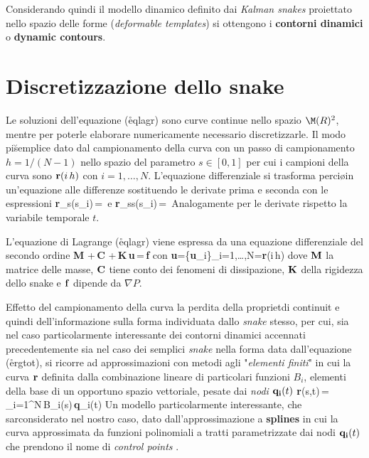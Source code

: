Considerando quindi il modello dinamico definito dai {\it Kalman snakes} proiettato
nello spazio delle forme ({\it deformable templates}) si ottengono i {\bf contorni dinamici}
o {\bf dynamic contours}.

\section{Discretizzazione dello snake}

Le soluzioni dell'equazione (\r{eqlagr}) sono curve continue nello spazio $\M(R)^2$, mentre
per poterle elaborare numericamente \e necessario discretizzarle.
Il modo pi\u semplice \e dato dal campionamento della curva con un passo di campionamento
$h=1/(N-1)$ nello spazio del parametro $s\in[0,1]$ per cui i campioni della curva sono 
${\bf r}(i\,h)$ con $i=1,\dots,N$.
L'equazione differenziale si trasforma perci\o in un'equazione alle differenze sostituendo
le derivate prima e seconda con le espressioni \footnotemark
\be
{\bf r}_s(s_i)\,=\, \quad e \quad
{\bf r}_{ss}(s_i)\,=\,
\ee
Analogamente per le derivate rispetto la variabile temporale $t$.


L'equazione di Lagrange (\r{eqlagr}) viene espressa da una equazione differenziale
del secondo ordine \cite{BlakeAV1}
\be
{\bf M\,}\,+\,{\bf C\,}\,+\,{\bf K\,u}\,=\,{\bf f} \quad con \quad
{\bf u}=\{{\bf u}_i\}_{i=1,\dots,N}={\bf r}(i\,h)
\ee
dove ${\bf M}$ \e la matrice delle masse, ${\bf C}$ tiene conto dei fenomeni di dissipazione,
${\bf K}$ della rigidezza dello snake e ${\bf f}$ dipende da $\nabla P$.

Effetto del campionamento della curva \e la perdita della propriet\a di continuit\a 
e quindi dell'informazione sulla forma individuata dallo {\it snake} stesso, per cui,
sia nel caso particolarmente interessante dei contorni dinamici accennati precedentemente
sia nel caso dei semplici {\it snake} nella forma data dall'equazione (\r{ergtot}), si ricorre
ad approssimazioni con metodi agli "{\it elementi finiti}" in cui la curva ${\bf r}$ \e
definita dalla combinazione lineare di particolari funzioni $B_i$, elementi della base di un
opportuno spazio vettoriale, pesate dai {\it nodi} ${\bf q_i}(t)$
\be
{\bf r}(s,t)\,=\,\sum_{i=1}^N\,B_i(s)\,{\bf q}_i(t)
\ee
Un modello particolarmente interessante, che sar\a considerato nel nostro caso, \e dato
dall'approssimazione a {\bf splines} in cui la curva \e approssimata da funzioni polinomiali
a tratti parametrizzate dai nodi ${\bf q_i}(t)$ che prendono il nome di {\it control points} \cite{BlakeAV2} \footnotemark. 

